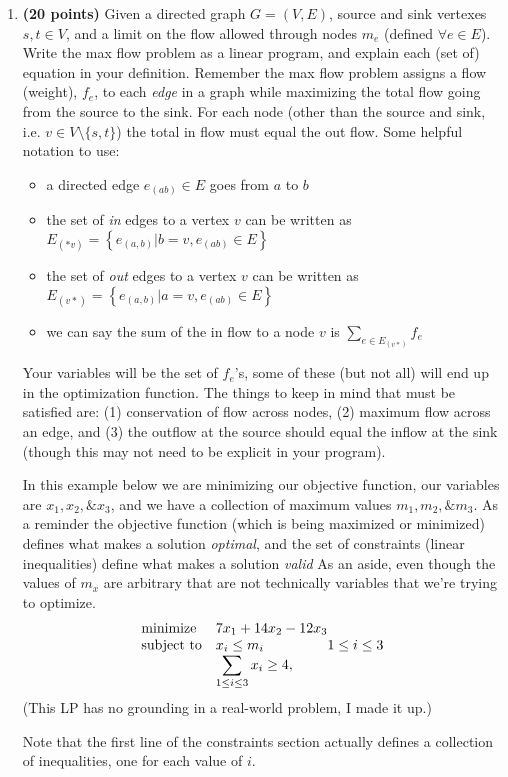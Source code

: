 \documentclass[11pt, oneside]{article}   	%
\begin{document}
\begin{enumerate}
\item \textbf{(20 points)}
Given a directed graph $G = (V,E)$, source and sink vertexes $s,t\in V$, and a limit on the flow allowed through nodes $m_e$ (defined $\forall e\in E$).
Write the max flow problem as a linear program, and explain each (set of) equation in your definition. 
Remember the max flow problem assigns a flow (weight), $f_e$, to each \emph{edge} in a graph
while maximizing the total flow going from the source to the sink. 
For each node (other than the source and sink, i.e. $v\in V\setminus\{s,t\}$) 
the total in flow must equal the out flow. 
Some helpful notation to use:
\begin{itemize}
\item a directed edge $e_{(ab)}\in E$ goes from $a$ to $b$
\item the set of \emph{in} edges to a vertex $v$  can be written as $E_{(*v)} = \left\{e_{(a,b)} | b = v,  e_{(ab)}\in E \right\}$
\item the set of \emph{out} edges to a vertex $v$  can be written as $E_{(v*)} = \left\{e_{(a,b)} | a = v, e_{(ab)}\in E\right\}$ 
\item we can say the sum of the in flow to a node $v$ is $\displaystyle\sum_{e \in E_{(v*)}} f_e$
\end{itemize}
Your variables will be the set of $f_e$'s, some of these (but not all) will end up in the optimization function. 
The things to keep in mind that must be satisfied are: 
(1) conservation of flow across nodes, 
(2) maximum flow across an edge, and 
(3) the outflow at the source should equal the inflow at the sink (though this may not need to be explicit in your program). 

\begin{tcolorbox}[colback=blue!5,colframe=blue!75!black,title=Writing down an LP] 
In this example below we are minimizing our objective function, our variables are $x_{1}, x_{2}, \& x_{3}$, and we have a collection of maximum values $m_{1}, m_{2}, \& m_{3}$. 
As a reminder the objective function (which is being maximized or minimized) defines what makes a solution \emph{optimal}, 
and the set of constraints (linear inequalities) define what makes a solution \emph{valid}
As an aside, even though the values of $m_{x}$ are arbitrary that are not technically variables that we're trying to optimize. 
\begin{equation*}
\begin{array}{ll@{}ll}
\text{minimize}  & 7 x_{1} + 14 x_{2} - 12 x_{3} \\
\text{subject to}& x_{i} \leq m_{i}  &1 \le i \le 3\\
			& \displaystyle\sum_{1 \le i \le 3}  x_{i} \geq 4,  &
\end{array}
\end{equation*}
(This LP has no grounding in a real-world problem, I made it up.) 

Note that the first line of the constraints section actually defines a collection of inequalities, one for each value of $i$. 
\end{tcolorbox}

\end{enumerate}
\end{document}
